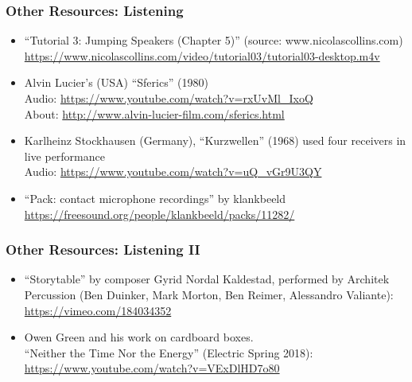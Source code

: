 \documentclass[screen, aspectratio=43]{beamer}
\begin{document}
%
\begin{frame}
  \frametitle{Other Resources: Listening}
    \begin{itemize}
    \item ``Tutorial 3: Jumping Speakers (Chapter 5)'' (source: www.nicolascollins.com)\\
    \url{https://www.nicolascollins.com/video/tutorial03/tutorial03-desktop.m4v}
    \item Alvin Lucier's (USA) ``Sferics'' (1980)\\
    Audio: \url{https://www.youtube.com/watch?v=rxUvMl_IxoQ}\\
    About: \url{http://www.alvin-lucier-film.com/sferics.html}
    \item Karlheinz Stockhausen (Germany), ``Kurzwellen'' (1968) used four receivers in live performance\\
    Audio: \url{https://www.youtube.com/watch?v=uQ_vGr9U3QY}
    \item ``Pack: contact microphone recordings'' by klankbeeld\\
    \url{https://freesound.org/people/klankbeeld/packs/11282/}
    \end{itemize}
\end{frame}
%
\begin{frame}
  \frametitle{Other Resources: Listening II}
    \begin{itemize}
    \item ``Storytable'' by composer Gyrid Nordal Kaldestad, performed by Architek Percussion (Ben Duinker, Mark Morton, Ben Reimer, Alessandro Valiante):\\
    \url{https://vimeo.com/184034352}
    \item Owen Green and his work on cardboard boxes. \\
    ``Neither the Time Nor the Energy'' (Electric Spring 2018): \url{https://www.youtube.com/watch?v=VExDlHD7o80}
    \end{itemize}
\end{frame}
%
%
\end{document}

